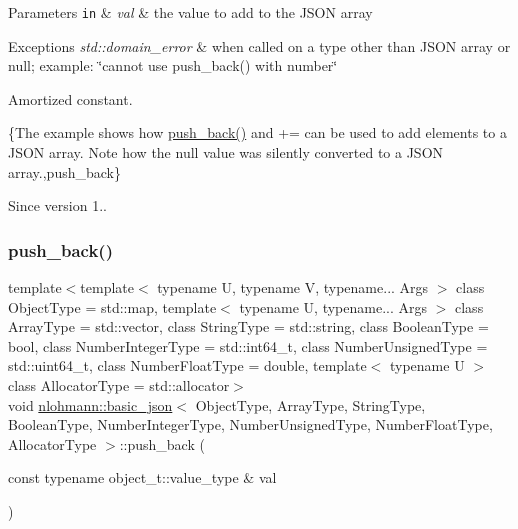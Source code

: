 \begin{DoxyParams}[1]{Parameters}
\mbox{\tt in}  & {\em val} & the value to add to the J\+S\+ON array\\
\hline
\end{DoxyParams}

\begin{DoxyExceptions}{Exceptions}
{\em std\+::domain\+\_\+error} & when called on a type other than J\+S\+ON array or null; example\+: {\ttfamily \char`\"{}cannot use push\+\_\+back() with number\char`\"{}}\\
\hline
\end{DoxyExceptions}
Amortized constant.

\{The example shows how {\ttfamily \hyperlink{classnlohmann_1_1basic__json_a486b96adbf4886c38e38c952394a220f}{push\+\_\+back()}} and {\ttfamily +=} can be used to add elements to a J\+S\+ON array. Note how the {\ttfamily null} value was silently converted to a J\+S\+ON array.,push\+\_\+back\}

\begin{DoxySince}{Since}
version 1.. 
\end{DoxySince}
\hypertarget{classnlohmann_1_1basic__json_a5212588544f6d2266384c3be9bfda0c5}{}\label{classnlohmann_1_1basic__json_a5212588544f6d2266384c3be9bfda0c5} 
\subsubsection{\texorpdfstring{push\+\_\+back()}{push\_back()}\hspace{0.1cm}{\footnotesize\ttfamily [3/4]}}
{\footnotesize\ttfamily template$<$template$<$ typename U, typename V, typename... Args $>$ class Object\+Type = std\+::map, template$<$ typename U, typename... Args $>$ class Array\+Type = std\+::vector, class String\+Type  = std\+::string, class Boolean\+Type  = bool, class Number\+Integer\+Type  = std\+::int64\+\_\+t, class Number\+Unsigned\+Type  = std\+::uint64\+\_\+t, class Number\+Float\+Type  = double, template$<$ typename U $>$ class Allocator\+Type = std\+::allocator$>$ \\
void \hyperlink{classnlohmann_1_1basic__json}{nlohmann\+::basic\+\_\+json}$<$ Object\+Type, Array\+Type, String\+Type, Boolean\+Type, Number\+Integer\+Type, Number\+Unsigned\+Type, Number\+Float\+Type, Allocator\+Type $>$\+::push\+\_\+back (\begin{DoxyParamCaption}\item[{const typename object\+\_\+t\+::value\+\_\+type \&}]{val }\end{DoxyParamCaption})\hspace{0.3cm}{\ttfamily [inline]}}



